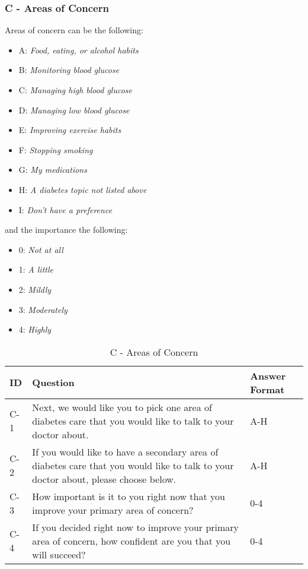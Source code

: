 \subsubsection{C - Areas of Concern}
Areas of concern can be the following:
\begin{itemize}
    \item A: \emph{Food, eating, or alcohol habits}
    \item B: \emph{Monitoring blood glucose}
    \item C: \emph{Managing high blood glucose}
    \item D: \emph{Managing low blood glucose}
    \item E: \emph{Improving exercise habits}
    \item F: \emph{Stopping smoking}
    \item G: \emph{My medications}
    \item H: \emph{A diabetes topic not listed above}
    \item I: \emph{Don't have a preference}
\end{itemize}
and the importance the following:
\begin{itemize}
    \item 0: \emph{Not at all}
    \item 1: \emph{A little}
    \item 2: \emph{Mildly}
    \item 3: \emph{Moderately}
    \item 4: \emph{Highly}
\end{itemize}
\begin{table}[H]
    \centering
    \renewcommand{\arraystretch}{1.2}
    \begin{tabularx}{\textwidth}{|l|X|l|}
        \hline
        \textbf{ID} & \textbf{Question} & \textbf{Answer Format} \\ \hline
        C-1 & Next, we would like you to pick one area of diabetes care that you would like to talk to your doctor about. & A-H \\ \hline
        C-2 & If you would like to have a secondary area of diabetes care that you would like to talk to your doctor about, please choose below. & A-H \\ \hline
        C-3 & How important is it to you right now that you improve your primary area of concern? & 0-4 \\ \hline
        C-4 & If you decided right now to improve your primary area of concern, how confident are you that you will succeed? & 0-4 \\ \hline
    \end{tabularx}
    \caption{C - Areas of Concern}
    \label{tab:areas-of-concern}
\end{table}


